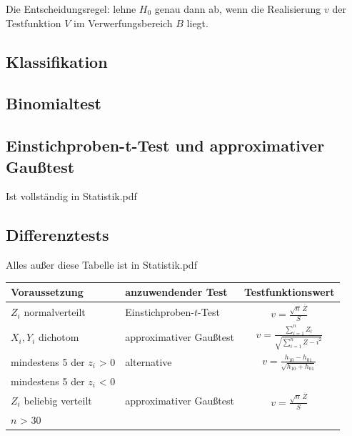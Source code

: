 \documentclass[a4paper]{article}
\begin{document}
Die Entscheidungsregel: lehne $H_0$ genau dann ab, wenn die Realisierung $v$ der Testfunktion $V$ im Verwerfungsbereich $B$ liegt.

\subsection{Klassifikation}



\subsection{Binomialtest}



\subsection{Einstichproben-t-Test und approximativer Gaußtest}


Ist vollständig in Statistik.pdf

\subsection{Differenztests}

Alles außer diese Tabelle ist in Statistik.pdf

\begin{center}
    \begin{tabular}{llc}
        Voraussetzung & anzuwendender Test & Testfunktionswert \\
        \hline
        $Z_i$ normalverteilt & Einstichproben-$t$-Test & $v = \frac{\sqrt{n}\,\overline{Z}}{S}$ \\
        $X_i, Y_i$ dichotom & approximativer Gaußtest & $v = \frac{\sum_{i=1}^{n} Z_i}{\sqrt{\sum_{i=1}^{n} Z-i^2}}$ \\
        mindestens 5 der $z_i$ > 0 & alternative & $v = \frac{h_{10} - h_{01}}{\sqrt{h_{10} + h_{01}}}$\\
        mindestens 5 der $z_i$ < 0 & & \\
        $Z_i$ beliebig verteilt & approximativer Gaußtest & $v = \frac{\sqrt{n}\,\overline{Z}}{S}$ \\
        $n$ > 30 & & \\
    \end{tabular}
\end{center}
\end{document}
